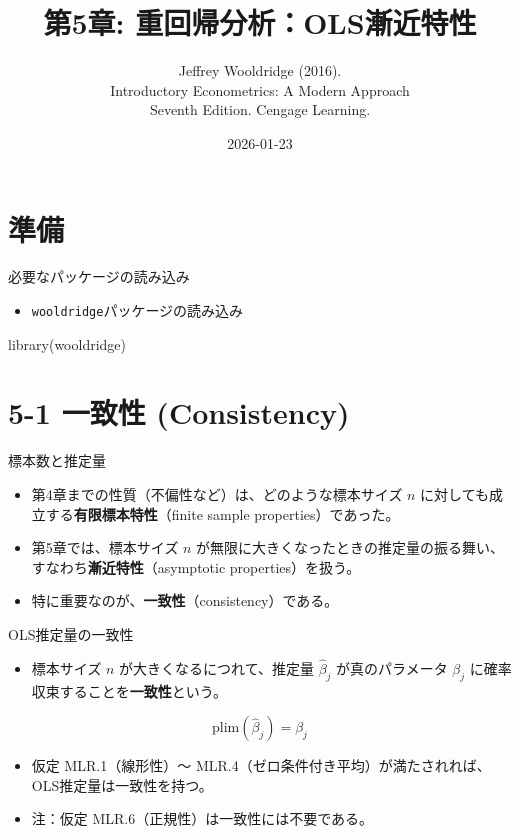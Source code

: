 \documentclass[
  ignorenonframetext,
]{beamer}
\title{第5章: 重回帰分析：OLS漸近特性}
\subtitle{Jeffrey Wooldridge (2016).\\
Introductory Econometrics: A Modern Approach\\
Seventh Edition. Cengage Learning.}
\author{}
\date{\vspace{-2.5em}2026-01-23}
\newenvironment{Shaded}{\begin{snugshade}}{\end{snugshade}}
\newcommand{\FunctionTok}[1]{\textcolor[rgb]{0.00,0.00,0.00}{#1}}
\newcommand{\NormalTok}[1]{#1}
\providecommand{\tightlist}{%
  \setlength{\itemsep}{0pt}\setlength{\parskip}{0pt}}
\begin{document}
\frame{\titlepage}

\hypertarget{ux6e96ux5099}{%
\section{準備}\label{ux6e96ux5099}}

\begin{frame}[fragile]{必要なパッケージの読み込み}
\protect\hypertarget{ux5fc5ux8981ux306aux30d1ux30c3ux30b1ux30fcux30b8ux306eux8aadux307fux8fbcux307f}{}
\begin{itemize}
\tightlist
\item
  \texttt{wooldridge}パッケージの読み込み
\end{itemize}

\begin{Shaded}
\begin{Highlighting}[]
\FunctionTok{library}\NormalTok{(wooldridge)}
\end{Highlighting}
\end{Shaded}
\end{frame}

\hypertarget{ux4e00ux81f4ux6027-consistency}{%
\section{5-1 一致性
(Consistency)}\label{ux4e00ux81f4ux6027-consistency}}

\begin{frame}{標本数と推定量}
\protect\hypertarget{ux6a19ux672cux6570ux3068ux63a8ux5b9aux91cf}{}
\begin{itemize}
\tightlist
\item
  第4章までの性質（不偏性など）は、どのような標本サイズ \(n\)
  に対しても成立する\textbf{有限標本特性}（finite sample
  properties）であった。
\item
  第5章では、標本サイズ \(n\)
  が無限に大きくなったときの推定量の振る舞い、すなわち\textbf{漸近特性}（asymptotic
  properties）を扱う。
\item
  特に重要なのが、\textbf{一致性}（consistency）である。
\end{itemize}
\end{frame}

\begin{frame}{OLS推定量の一致性}
\protect\hypertarget{olsux63a8ux5b9aux91cfux306eux4e00ux81f4ux6027}{}
\begin{itemize}
\tightlist
\item
  標本サイズ \(n\) が大きくなるにつれて、推定量 \(\hat{\beta}_j\)
  が真のパラメータ \(\beta_j\)
  に確率収束することを\textbf{一致性}という。
\end{itemize}

\[ \text{plim}(\hat{\beta}_j) = \beta_j \]

\begin{itemize}
\tightlist
\item
  仮定 MLR.1（線形性）〜
  MLR.4（ゼロ条件付き平均）が満たされれば、OLS推定量は一致性を持つ。
\item
  注：仮定 MLR.6（正規性）は一致性には不要である。
\end{itemize}
\end{frame}
\end{document}
